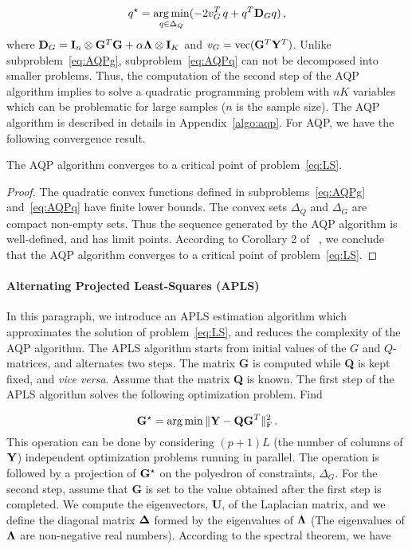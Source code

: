 \begin{equation}
\begin{aligned}
q^\star = \underset{q \in \Delta_Q}{\arg \min} ( -2 v^T_G \, q + q^T {\bf D}_G q ) \,  ,
\end{aligned}
\label{eq:AQPq}
\end{equation}
\noindent where ${\bf D}_G = {\bf I}_{n} \otimes {\bf G}^T {\bf G } + \alpha
{\bf \Lambda} \otimes {\bf I}_K$ and $v_G = {\rm vec}({\bf G}^T{\bf Y}^T)$.
Unlike subproblem~\eqref{eq:AQPg}, subproblem~\eqref{eq:AQPq} can not be
decomposed into smaller problems. Thus, the computation of the second step of
the AQP algorithm implies to solve a quadratic programming problem with $nK$
variables which can be problematic for large samples ($n$ is the sample size).
The AQP algorithm is described in details in Appendix~\ref{algo:aqp}. For AQP,
we have the following convergence result.
\begin{thm}
\label{th}
	The AQP algorithm converges to a critical point of problem~\eqref{eq:LS}.
\end{thm}
\begin{proof}
  The quadratic convex functions defined in subproblems~\eqref{eq:AQPg}
  and~\eqref{eq:AQPq} have finite lower bounds. The convex sets $\Delta_Q$ and
  $\Delta_G$ are compact non-empty sets. Thus the sequence generated by the AQP
  algorithm is well-defined, and has limit points. According to Corollary 2 of
  ~\cite{Grippo2000}, we conclude that the AQP algorithm converges to a critical
  point of problem~\eqref{eq:LS}.
\end{proof}

\paragraph{Alternating Projected Least-Squares (APLS)} In this paragraph, we
introduce an APLS estimation algorithm which approximates the solution of
problem~\eqref{eq:LS}, and reduces the complexity of the AQP algorithm. The APLS
algorithm starts from initial values of the $G$ and $Q$-matrices, and alternates
two steps. The matrix {\bf G} is computed while {\bf Q} is kept fixed, and {\it
  vice versa}. Assume that the matrix {\bf Q} is known. The first step of the
APLS algorithm solves the following optimization problem. Find

\begin{equation}
{\bf G}^\star = \arg \min  \|  {\bf Y} - {\bf QG}^T \|^2_{\rm F} \, .
\end{equation}
This operation can be done by considering $(p+1)L$ (the number of columns of
${\bf Y}$) independent optimization problems running in parallel. The operation
is followed by a projection of ${\bf G}^\star$ on the polyedron of constraints,
$\Delta_G$. For the second step, assume that {\bf G} is set to the value
obtained after the first step is completed. We compute the eigenvectors, {\bf
  U}, of the Laplacian matrix, and we define the diagonal matrix ${\bf \Delta}$
formed by the eigenvalues of ${\bf \Lambda}$ (The eigenvalues of ${\bf \Lambda}$
are non-negative real numbers). According to the spectral theorem, we have

